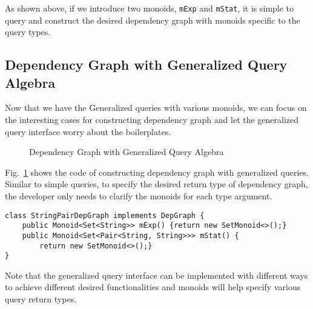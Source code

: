 
As shown above, if we introduce two monoids, \lstinline{mExp} and \lstinline{mStat}, it is simple to query and construct the desired dependency graph with monoids specific to the query types.  

\subsection{Dependency Graph with Generalized Query Algebra}\label{subsec:DepGraphWithGeneralizedQuery}
Now that we have the Generalized queries with various monoids, we can focus on the interesting cases for constructing dependency graph and let the generalized query interface worry about the boilerplates. 

\begin{figure}[tb]
\vspace{-.1in}
\caption{Dependency Graph with Generalized Query Algebra}
\label{deps2}
\end{figure}

Fig.~\ref{deps2} shows the code of constructing dependency graph with generalized queries. Similar to simple queries, to specify the desired return type of dependency graph, the developer only needs to clarify the monoids for each type argument. 

\begin{lstlisting}[numbers=none]
class StringPairDepGraph implements DepGraph {
	public Monoid<Set<String>> mExp() {return new SetMonoid<>();}
	public Monoid<Set<Pair<String, String>>> mStat() {
		return new SetMonoid<>();}
}
\end{lstlisting}

Note that the generalized query interface can be implemented with different ways to achieve different desired functionalities and monoids will help specify various query return types. 